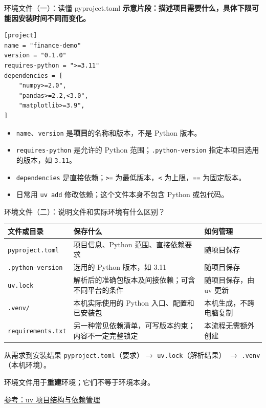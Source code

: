 \documentclass[9pt]{ctexbeamer}
\begin{document}
\begin{frame}[fragile]{环境文件（一）：读懂 pyproject.toml}
  \textbf{示意片段：描述项目需要什么，具体下限可能因安装时间不同而变化。}
\begin{lstlisting}[language={},numbers=none]
[project]
name = "finance-demo"
version = "0.1.0"
requires-python = ">=3.11"
dependencies = [
    "numpy>=2.0",
    "pandas>=2.2,<3.0",
    "matplotlib>=3.9",
]
\end{lstlisting}
  \begin{itemize}
    \item \texttt{name}、\texttt{version} 是\textbf{项目}的名称和版本，不是 Python 版本。
    \item \texttt{requires-python} 是允许的 Python 范围；\texttt{.python-version} 指定本项目选用的版本，如 \texttt{3.11}。
    \item \texttt{dependencies} 是直接依赖；\texttt{>=} 为最低版本，\texttt{<} 为上限，\texttt{==} 为固定版本。
    \item 日常用 \texttt{uv add} 修改依赖；这个文件本身不包含 Python 或包代码。
  \end{itemize}
\end{frame}

\begin{frame}{环境文件（二）：说明文件和实际环境有什么区别？}
  \small
  \begin{tabular}{p{}p{}p{}}
    \toprule
    文件或目录 & 保存什么 & 如何管理 \\
    \midrule
    \texttt{pyproject.toml} & 项目信息、Python 范围、直接依赖要求 & 随项目保存 \\[7pt]
    \texttt{.python-version} & 选用的 Python 版本，如 3.11 & 随项目保存 \\[7pt]
    \texttt{uv.lock} & 解析后的准确包版本及间接依赖；可含不同平台的条件 & 随项目保存，由 uv 更新 \\[7pt]
    \texttt{.venv/} & 本机实际使用的 Python 入口、配置和已安装包 & 本机生成，不跨电脑复制 \\[7pt]
    \texttt{requirements.txt} & 另一种常见依赖清单，可写版本约束；内容不一定完整锁定 & 本流程无需额外创建 \\
    \bottomrule
  \end{tabular}
  \vspace{0.3cm}
  \begin{block}{从需求到安装结果}
    \texttt{pyproject.toml}（要求）$\rightarrow$ \texttt{uv.lock}（解析结果）
    $\rightarrow$ \texttt{.venv}（本机环境）。\par
    环境文件用于\textbf{重建}环境；它们不等于环境本身。
  \end{block}
  {\tiny\href{https://docs.astral.sh/uv/guides/projects/}{参考：uv 项目结构与依赖管理}}
\end{frame}
\end{document}
